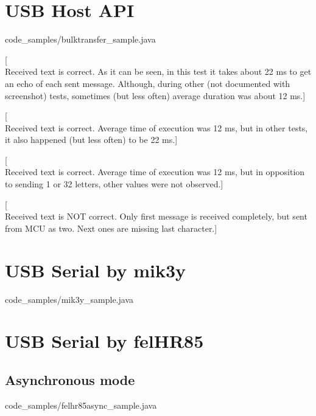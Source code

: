 \documentclass[]{mgr} %
\begin{document}

\section{USB Host API}


{code_samples/bulktransfer_sample.java}

[\\Received text is correct. As it can be seen, in this test it takes about 22
ms to get an echo of each sent message. Although, during other (not documented
with screenshot) tests, sometimes (but less often) average duration was about 12
ms.]

[\\Received text is correct. Average time of execution was 12 ms, but in other
tests, it also happened (but less often) to be 22 ms.]

[\\Received text is correct. Average time of execution was 12 ms, but in
opposition to sending 1 or 32 letters, other values were not observed.]

[\\Received text is NOT correct. Only first message is received completely, but
sent from MCU as two. Next ones are missing last character.]

\section{USB Serial by mik3y}


{code_samples/mik3y_sample.java}

\section{USB Serial by felHR85}

\subsection{Asynchronous mode}


{code_samples/felhr85async_sample.java}
\end{document}
